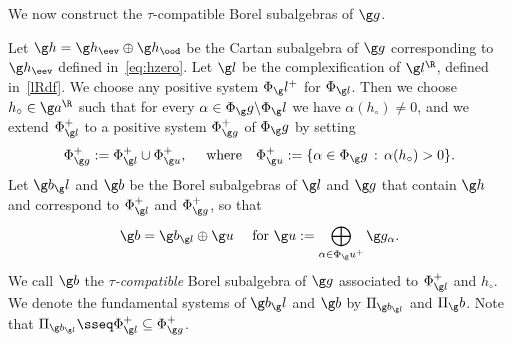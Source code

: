 \documentclass[12pt]{amsart}
\begin{document}
We now construct the $\tau$-compatible Borel subalgebras of $\g g$.
\begin{dfn}
Let $\g h=\g h_\eev\oplus \g h_\ood$ be the Cartan subalgebra of $\g g$ corresponding to $\g h_\eev$ defined in~\eqref{eq:hzero}.  
Let $\g l$ be the complexification of $\g l^\R$, defined in~\eqref{lRdf}. 
We choose any positive system $\Phi_\g l^+$ for  $\Phi_{\g l}$.
Then we choose $h_\circ\in\g a^\R$ such that for every $\alpha\in\Phi_\g g\backslash \Phi_\g l$ we have $\alpha(h_\circ)\neq 0$, and 
  we extend $\Phi_{\g l}^+$  to a positive system $\Phi^+_{\g g}$ of  $\Phi_\g g$  by setting
\[
\Phi_{\g g}^+:=\Phi_{\g l}^+\cup\Phi^+_{\g u},\quad\text{ where}\quad\Phi^+_{\g u}:=\{\alpha\in\Phi_\g g\,:\,\alpha(h_\circ)>0\}.
\]
Let $\g b_\g l$ and $\g b$ be the Borel subalgebras of $\g l$ and $\g g$ that contain $\g h$ and correspond to $\Phi_{\g l}^+$ and $\Phi_{\g g}^+$, so that
\begin{equation}
\label{eq:b=bl+u}
\g b=\g b_{\g l}\oplus\g u\quad\text{ for   }\g u:=\bigoplus_{\alpha\in\Phi_\g u^+}\g g_\alpha.
\end{equation} 
We call $\g b$ the \emph{$\tau$-compatible} Borel subalgebra of $\g g$ associated to $\Phi^+_{\g l}$ and $h_\circ$.
We denote the fundamental systems of $\g b_\g l$ and $\g b$ by $\Pi_{\g b_{\g l}}$ and $\Pi_\g b$. Note that 
$\Pi_{\g b_{\g l}}\sseq \Phi_{\g l}^+\subseteq\Phi_{\g g}^+$.  
\end{dfn}
\end{document}

